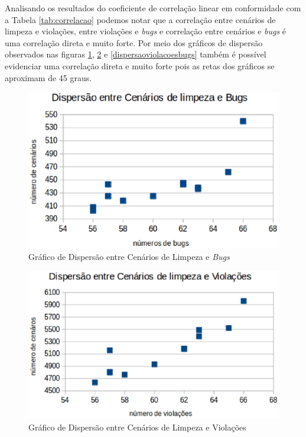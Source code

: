 Analisando os resultados do coeficiente de correlação linear em conformidade com a Tabela \ref{tab:correlacao} podemos notar que a correlação entre cenários de limpeza e violações, entre violações e \textit{bugs} e correlação entre cenários e \textit{bugs} é uma correlação direta e muito forte. Por meio dos gráficos de dispersão observados nas figuras \ref{dispercaocenariosbugs}, \ref{dispersaocenariosviolacoes} e \ref{dispersaoviolacoesbugs} também é possível evidenciar uma correlação direta e muito forte pois as retas dos gráficos se aproximam de 45 graus.

\begin{figure}[H]
\centering
\includegraphics[keepaspectratio=false,scale=0.7]{figuras/figuras_nilton/dispercaocenariosbugs.eps}
\caption{Gráfico de Dispersão entre Cenários de Limpeza e \textit{Bugs}}
\label{dispercaocenariosbugs}
\end{figure}


\begin{figure}[H]
\centering
\includegraphics[keepaspectratio=false,scale=0.7]{figuras/figuras_nilton/dispersaocenariosviolacoes.eps}
\caption{Gráfico de Dispersão entre Cenários de Limpeza e Violações}
\label{dispersaocenariosviolacoes}
\end{figure}

